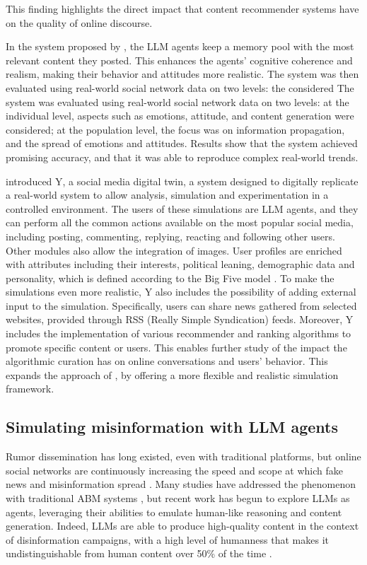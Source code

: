 This finding highlights the direct impact that content recommender systems have on the quality of online discourse.
\medskip

In the system proposed by \citet{gao2023s3socialnetworksimulationlarge}, the LLM agents keep a memory pool with the most relevant content they posted. This enhances the agents' cognitive coherence and realism, making their behavior and attitudes more realistic.
The system was then evaluated using real-world social network data on two levels: the considered The system was evaluated using real-world social network data on two levels: at the individual level, aspects such as emotions, attitude, and content generation were considered; at the population level, the focus was on information propagation, and the spread of emotions and attitudes. 
Results show that the system achieved promising accuracy, and that it was able to reproduce complex real-world trends.

\medskip
\citet{rossetti2024ysocialllmpoweredsocial} introduced Y, a social media digital twin, a system designed to digitally replicate a real-world system to allow analysis, simulation and experimentation in a controlled environment.
The users of these simulations are LLM agents, and they can perform all the common actions available on the most popular social media, including posting, commenting, replying, reacting and following other users. Other modules also allow the integration of images.
User profiles are enriched with attributes including their interests, political leaning, demographic data and personality, which is defined according to the Big Five model \cite{McCrae1992}.
To make the simulations even more realistic, Y also includes the possibility of adding external input to the simulation. Specifically, users can share news gathered from selected websites, provided through RSS (Really Simple Syndication) feeds.
Moreover, Y includes the implementation of various recommender and ranking algorithms to promote specific content or users. This enables further study of the impact the algorithmic curation has on online conversations and users' behavior. This expands the approach of \citet{törnberg2023evaluate}, by offering a more flexible and realistic simulation framework.



\subsection{Simulating misinformation with LLM agents}
Rumor dissemination has long existed, even with traditional platforms, but online social networks are continuously increasing the speed and scope at which fake news and misinformation spread \cite{aimeur2023fake}. 
Many studies have addressed the phenomenon with traditional ABM systems \cite{gausen2021can, sulis2020, muhammad2024agent}, but recent work has begun to explore LLMs as agents, leveraging their abilities to emulate human-like reasoning and content generation.
Indeed, LLMs are able to produce high-quality content in the context of disinformation campaigns, with a high level of humanness that makes it undistinguishable from human content over 50\% of the time \cite{williams2025hqdisinformation}.

